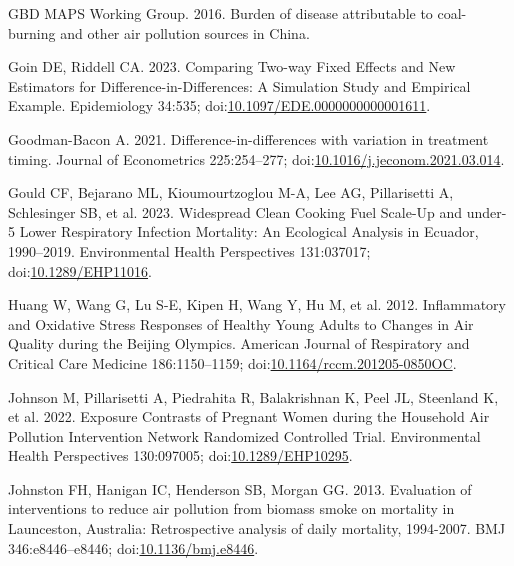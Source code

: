 \documentclass[
  letterpaper,
  DIV=11,
  numbers=noendperiod]{scrartcl}
\newlength{\cslhangindent}
\newlength{\cslentryspacingunit} %
\newenvironment{CSLReferences}[2] %
 {%
  \setlength{\parindent}{0pt}
  \ifodd #1
  \let\oldpar\par
  \def\par{\hangindent=\cslhangindent\oldpar}
  \fi
  \setlength{\parskip}{#2\cslentryspacingunit}
 }%
 {}
\begin{document}
\begin{CSLReferences}{1}{0}
\leavevmode{}%
GBD MAPS Working Group. 2016. Burden of disease attributable to
coal-burning and other air pollution sources in {China}.

\leavevmode{}%
Goin DE, Riddell CA. 2023. Comparing {Two-way Fixed Effects} and {New
Estimators} for {Difference-in-Differences}: {A Simulation Study} and
{Empirical Example}. Epidemiology 34:535;
doi:\href{https://doi.org/10.1097/EDE.0000000000001611}{10.1097/EDE.0000000000001611}.

\leavevmode{}%
Goodman-Bacon A. 2021. Difference-in-differences with variation in
treatment timing. Journal of Econometrics 225:254--277;
doi:\href{https://doi.org/10.1016/j.jeconom.2021.03.014}{10.1016/j.jeconom.2021.03.014}.

\leavevmode{}%
Gould CF, Bejarano ML, Kioumourtzoglou M-A, Lee AG, Pillarisetti A,
Schlesinger SB, et al. 2023. Widespread {Clean Cooking Fuel Scale-Up}
and under-5 {Lower Respiratory Infection Mortality}: {An Ecological
Analysis} in {Ecuador}, 1990--2019. Environmental Health Perspectives
131:037017;
doi:\href{https://doi.org/10.1289/EHP11016}{10.1289/EHP11016}.

\leavevmode{}%
Huang W, Wang G, Lu S-E, Kipen H, Wang Y, Hu M, et al. 2012.
Inflammatory and {Oxidative Stress Responses} of {Healthy Young Adults}
to {Changes} in {Air Quality} during the {Beijing Olympics}. American
Journal of Respiratory and Critical Care Medicine 186:1150--1159;
doi:\href{https://doi.org/10.1164/rccm.201205-0850OC}{10.1164/rccm.201205-0850OC}.

\leavevmode{}%
Johnson M, Pillarisetti A, Piedrahita R, Balakrishnan K, Peel JL,
Steenland K, et al. 2022. Exposure {Contrasts} of {Pregnant Women}
during the {Household Air Pollution Intervention Network Randomized
Controlled Trial}. Environmental Health Perspectives 130:097005;
doi:\href{https://doi.org/10.1289/EHP10295}{10.1289/EHP10295}.

\leavevmode{}%
Johnston FH, Hanigan IC, Henderson SB, Morgan GG. 2013. Evaluation of
interventions to reduce air pollution from biomass smoke on mortality in
{Launceston}, {Australia}: Retrospective analysis of daily mortality,
1994-2007. BMJ 346:e8446--e8446;
doi:\href{https://doi.org/10.1136/bmj.e8446}{10.1136/bmj.e8446}.


\end{CSLReferences}
\end{document}

